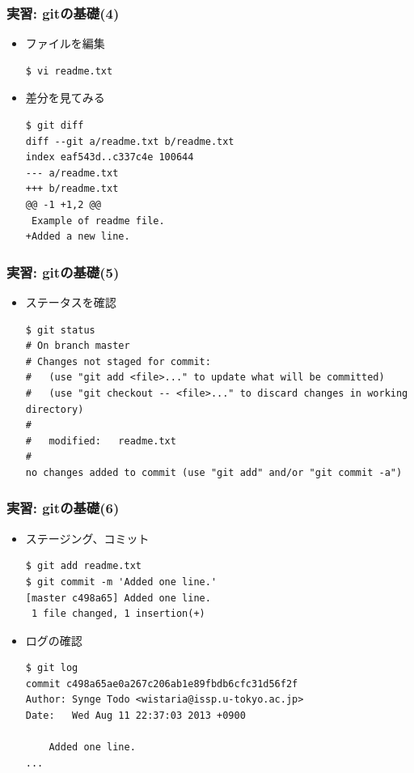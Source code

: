 \begin{frame}[t,fragile]
  \frametitle{実習: gitの基礎(4)}
  \begin{itemize}
  \item ファイルを編集
\begin{lstlisting}
$ vi readme.txt
\end{lstlisting}
  \item 差分を見てみる
\begin{lstlisting}
$ git diff
diff --git a/readme.txt b/readme.txt
index eaf543d..c337c4e 100644
--- a/readme.txt
+++ b/readme.txt
@@ -1 +1,2 @@
 Example of readme file.
+Added a new line.
\end{lstlisting}
  \end{itemize}
\end{frame}

\begin{frame}[t,fragile]
  \frametitle{実習: gitの基礎(5)}
  \begin{itemize}
  \item ステータスを確認
\begin{lstlisting}
$ git status
# On branch master
# Changes not staged for commit:
#   (use "git add <file>..." to update what will be committed)
#   (use "git checkout -- <file>..." to discard changes in working directory)
#
#	modified:   readme.txt
#
no changes added to commit (use "git add" and/or "git commit -a")
\end{lstlisting}
  \end{itemize}
\end{frame}

\begin{frame}[t,fragile]
  \frametitle{実習: gitの基礎(6)}
  \begin{itemize}
  \item ステージング、コミット
\begin{lstlisting}
$ git add readme.txt
$ git commit -m 'Added one line.'
[master c498a65] Added one line.
 1 file changed, 1 insertion(+)
\end{lstlisting}
  \item ログの確認
\begin{lstlisting}
$ git log
commit c498a65ae0a267c206ab1e89fbdb6cfc31d56f2f
Author: Synge Todo <wistaria@issp.u-tokyo.ac.jp>
Date:   Wed Aug 11 22:37:03 2013 +0900

    Added one line.
...
\end{lstlisting}
  \end{itemize}
\end{frame}

